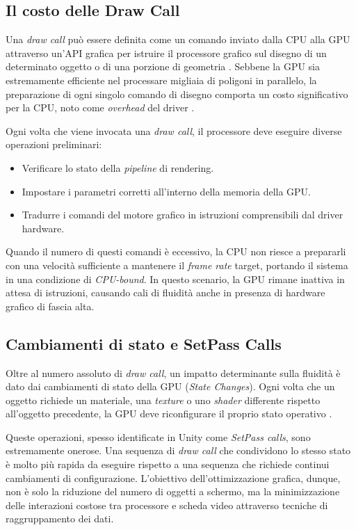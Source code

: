 \subsection{Il costo delle Draw Call}

Una \textit{draw call} può essere definita come un comando inviato dalla CPU alla GPU attraverso un'API grafica per istruire il processore grafico sul disegno di un determinato oggetto o di una porzione di geometria \cite{AkenineRealTimeRendering}. Sebbene la GPU sia estremamente efficiente nel processare migliaia di poligoni in parallelo, la preparazione di ogni singolo comando di disegno comporta un costo significativo per la CPU, noto come \textit{overhead} del driver \cite{GregoryGameEngine}.

Ogni volta che viene invocata una \textit{draw call}, il processore deve eseguire diverse operazioni preliminari:
\begin{itemize}
    \item Verificare lo stato della \textit{pipeline} di rendering.
    \item Impostare i parametri corretti all'interno della memoria della GPU.
    \item Tradurre i comandi del motore grafico in istruzioni comprensibili dal driver hardware.
\end{itemize}

Quando il numero di questi comandi è eccessivo, la CPU non riesce a prepararli con una velocità sufficiente a mantenere il \textit{frame rate} target, portando il sistema in una condizione di \textit{CPU-bound}. In questo scenario, la GPU rimane inattiva in attesa di istruzioni, causando cali di fluidità anche in presenza di hardware grafico di fascia alta.

\subsection{Cambiamenti di stato e SetPass Calls}

Oltre al numero assoluto di \textit{draw call}, un impatto determinante sulla fluidità è dato dai cambiamenti di stato della GPU (\textit{State Changes}). Ogni volta che un oggetto richiede un materiale, una \textit{texture} o uno \textit{shader} differente rispetto all'oggetto precedente, la GPU deve riconfigurare il proprio stato operativo \cite{AkenineRealTimeRendering, GregoryGameEngine}. 

Queste operazioni, spesso identificate in Unity come \textit{SetPass calls}, sono estremamente onerose. Una sequenza di \textit{draw call} che condividono lo stesso stato è molto più rapida da eseguire rispetto a una sequenza che richiede continui cambiamenti di configurazione. L'obiettivo dell'ottimizzazione grafica, dunque, non è solo la riduzione del numero di oggetti a schermo, ma la minimizzazione delle interazioni costose tra processore e scheda video attraverso tecniche di raggruppamento dei dati.

